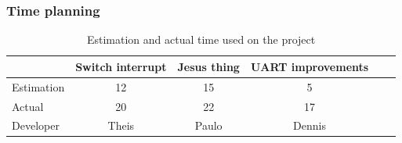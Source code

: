 \subsubsection{Time planning}

\begin{table}[H]
\centering
	\begin{tabular}{|l|c|c|c|c|c|}
		\hline
		~			& Switch interrupt		& Jesus thing		& UART improvements	\\ \hline
		Estimation	& 12					& 15				& 5					\\
		Actual		& 20					& 22				& 17				\\
		Developer	& Theis					& Paulo			& Dennis				\\
		\hline
	\end{tabular}
	\caption{Estimation and actual time used on the project}
\end{table}


